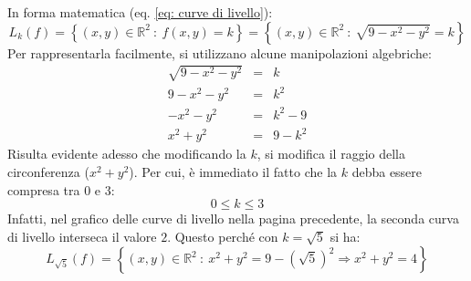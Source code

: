 \documentclass[a4paper]{article}
\begin{document}
	\noindent
	In forma matematica (eq. \ref{eq: curve di livello}):
	\begin{equation*}
		L_{k}\left(f\right) = \left\{\left(x,y\right) \in \mathbb{R}^{2} \: : \: f\left(x,y\right) = k\right\} = \left\{\left(x,y\right) \in \mathbb{R}^{2} \: : \: \sqrt{9-x^{2} -y^{2}} = k\right\}
	\end{equation*}
	Per rappresentarla facilmente, si utilizzano alcune manipolazioni algebriche:
	\begin{equation*}
		\begin{array}{rcl}
			\sqrt{9-x^{2} -y^{2}} &=& k \\ [.3em]
			9-x^{2} -y^{2} &=& k^{2} \\ [.3em]
			-x^{2} -y^{2} &=& k^{2} - 9 \\ [.3em]
			x^{2} + y^{2} &=& 9 - k^{2}
		\end{array}
	\end{equation*}
	Risulta evidente adesso che modificando la $k$, si modifica il raggio della circonferenza ($x^{2}+y^{2}$). Per cui, è immediato il fatto che la $k$ debba essere compresa tra $0$ e $3$:
	\begin{equation*}
		0 \le k \le 3
	\end{equation*}
	Infatti, nel grafico delle curve di livello nella pagina precedente, la seconda curva di livello interseca il valore $2$. Questo perché con $k = \sqrt{5}$ si ha:
	\begin{equation*}
		L_{\sqrt{5}}\left(f\right) = \left\{\left(x,y\right) \in \mathbb{R}^{2} \: : \: x^{2} + y^{2} = 9 - \left(\sqrt{5}\right)^{2} \Rightarrow x^{2} + y^{2} = 4\right\}
	\end{equation*}\newpage
\end{document}
